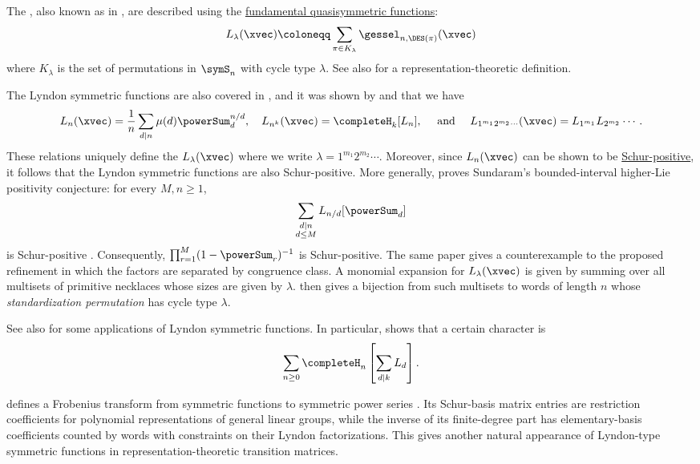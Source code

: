 The \label{lyndonSymmetricFunctionDefinition},
also known as \label{higherLieCharacterDefinition}
in \cite{AdinHegedusRoichman2019x}, are described using the
\hyperref[gessel]{fundamental quasisymmetric functions}:
\[
L_{\lambda}(\xvec) \coloneqq
\sum_{\pi \in K_\lambda} \gessel_{n,\DES(\pi)}(\xvec)
\]
where $K_\lambda$ is the set of permutations in $\symS_n$ with cycle type $\lambda$.
See also \cite[Def.~1.5]{AdinHegedusRoichman2019x} for a
representation-theoretic definition.


The Lyndon symmetric functions are also covered in \cite[p.~480]{StanleyEC2},
and it was shown by  and 
\cite[Thm.~3.6]{GesselReutenauer1993} that we have
\begin{equation}
L_{n}(\xvec) = \frac{1}{n} \sum_{d \mid n} \mu(d)\powerSum_{d}^{n/d},
\quad
L_{n^k}(\xvec) = \completeH_k[L_{n}],
\quad
\text{ and }
\quad
L_{1^{m_1}2^{m_2}\dotsb}(\xvec) = L_{1^{m_1}} L_{2^{m_2}} \dotsm.
\end{equation}
These relations uniquely define the $L_{\lambda}(\xvec)$ where
we write $\lambda = 1^{m_1}2^{m_2}\dotsb$.
Moreover, since $L_{n}(\xvec)$ can be shown to be \hyperref[schurPositivity]{Schur-positive},
it follows that the Lyndon symmetric functions are also Schur-positive.
More generally,  proves Sundaram's bounded-interval
higher-Lie positivity conjecture: for every $M,n\geq1$,
\[
 \sum_{\substack{d\mid n\\d\leq M}} L_{n/d}[\powerSum_d]
\]
is Schur-positive \cite{Hou2026x}.  Consequently,
$\prod_{r=1}^{M}(1-\powerSum_r)^{-1}$ is Schur-positive.  The same paper
gives a counterexample to the proposed refinement in which the factors are
separated by congruence class.
A monomial expansion for $L_{\lambda}(\xvec)$ is given by summing over all
multisets of primitive necklaces whose sizes are given by $\lambda$.
 then gives a bijection from such multisets to
words of length $n$ whose \emph{standardization permutation} has cycle type
$\lambda$.


See also \cite[Ex.~7.69c]{StanleyEC2} for some applications of Lyndon
symmetric functions.
In particular,  shows that a certain character is
\[
  \sum_{n\geq 0} \completeH_{n}\left[ \sum_{d\mid k} L_d \right].
\]

 defines a Frobenius transform from symmetric functions to
symmetric power series \cite{Lee2023x}.  Its Schur-basis matrix entries are
restriction coefficients for polynomial representations of general linear
groups, while the inverse of its finite-degree part has elementary-basis
coefficients counted by words with constraints on their Lyndon factorizations.
This gives another natural appearance of Lyndon-type symmetric functions in
representation-theoretic transition matrices.


